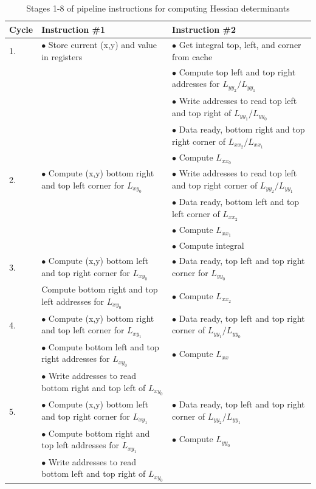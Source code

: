 \documentclass{article}
\begin{document}
\begin{table}[h]
	\centering
	\caption{Stages 1-8 of pipeline instructions for computing Hessian determinants}
	\label{table_pipeline_1}
	\begin{tabulary}{1.0\textwidth}{L|L|L}
		Cycle & Instruction \#1 & Instruction \#2 \\
		\hline
		
		1. & $\bullet$ Store current (x,y) and value in registers & $\bullet$ Get integral top, left, and corner from cache \\
		& & $\bullet$ Compute top left and top right addresses for $L_{yy_2}/L_{yy_1}$ \\
		& & $\bullet$ Write addresses to read top left and top right of $L_{yy_1}/L_{yy_0}$ \\
		& & $\bullet$ Data ready, bottom right and top right corner of $L_{xx_2}/L_{xx_1}$ \\
		& & $\bullet$ Compute $L_{xx_0}$ \\
		\hline
		
		2. & $\bullet$ Compute (x,y) bottom right and top left corner for $L_{xy_0}$ & $\bullet$ Write addresses to read top left and top right corner of $L_{yy_2}/L_{yy_1}$ \\
		& & $\bullet$ Data ready, bottom left and top left corner of $L_{xx_2}$ \\
		& & $\bullet$ Compute $L_{xx_1}$ \\
		& & $\bullet$ Compute integral \\
		\hline
		
		3. & $\bullet$ Compute (x,y) bottom left and top right corner for $L_{xy_0}$ & $\bullet$ Data ready, top left and top right corner for $L_{yy_0}$ \\
		& Compute bottom right and top left addresses for $L_{xy_0}$ & $\bullet$ Compute $L_{xx_2}$ \\
		\hline
		
		4. & $\bullet$ Compute (x,y) bottom right and top left corner for $L_{xy_1}$ & $\bullet$ Data ready, top left and top right corner of $L_{yy_1}/L_{yy_0}$ \\
		& $\bullet$ Compute bottom left and top right addresses for $L_{xy_0}$ & $\bullet$ Compute $L_{xx}$ \\
		& $\bullet$ Write addresses to read bottom right and top left of $L_{xy_0}$ & \\
		\hline
		
		5. & $\bullet$ Compute (x,y) bottom left and top right corner for $L_{xy_1}$ & $\bullet$ Data ready, top left and top right corner of $L_{yy_2}/L_{yy_1}$ \\
		& $\bullet$ Compute bottom right and top left addresses for $L_{xy_1}$ & $\bullet$ Compute $L_{yy_0}$ \\
		& $\bullet$ Write addresses to read bottom left and top right of $L_{xy_0}$ & \\
		\hline
		

\end{tabulary}
\end{table}
\end{document}
